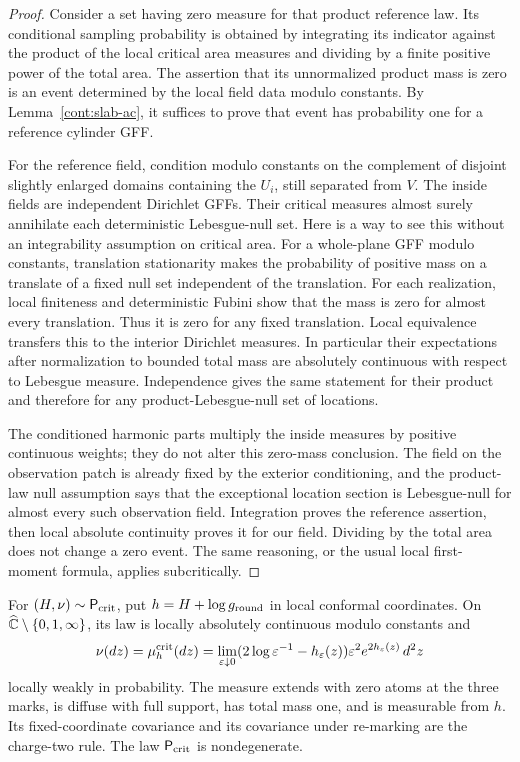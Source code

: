 \begin{proof}
Consider a set having zero measure for that product reference law.  Its
conditional sampling probability is obtained by integrating its indicator
against the product of the local critical area measures and dividing by a
finite positive power of the total area.  The assertion that its unnormalized
product mass is zero is an event determined by the local field data modulo
constants.  By Lemma~\ref{cont:slab-ac}, it suffices to prove that event has
probability one for a reference cylinder GFF.

For the reference field, condition modulo constants on the complement of
disjoint slightly enlarged domains containing the $U_i$, still separated
from $V$.  The inside fields are independent Dirichlet GFFs.  Their critical
measures almost surely annihilate each deterministic Lebesgue-null set.
Here is a way to see this without an integrability assumption on critical
area.  For a whole-plane GFF modulo constants, translation stationarity
makes the probability of positive mass on a translate of a fixed null set
independent of the translation.  For each realization, local finiteness and
deterministic Fubini show that the mass is zero for almost every translation.
Thus it is zero for any fixed translation.  Local equivalence transfers this
to the interior Dirichlet measures.  In particular their expectations after
normalization to bounded total mass are absolutely continuous with respect
to Lebesgue measure.  Independence gives the same statement for their
product and therefore for any product-Lebesgue-null set of locations.

The conditioned harmonic parts multiply the inside measures by positive
continuous weights; they do not alter this zero-mass conclusion.  The field
on the observation patch is already fixed by the exterior conditioning, and
the product-law null assumption says that the exceptional location section
is Lebesgue-null for almost every such observation field.  Integration proves
the reference assertion, then local absolute continuity proves it for our
field.  Dividing by the total area does not change a zero event.  The same
reasoning, or the usual local first-moment formula, applies subcritically.
\end{proof}

\begin{proposition}
\label{cont:area-identification}
For $(H,\nu)\sim \mathsf P_{\rm crit}$, put $h=H+\log g_{\rm round}$ in local
conformal coordinates.  On $\widehat{\mathbb C}\setminus\{0,1,\infty\}$, its law is
locally absolutely continuous modulo constants and
\[
 \nu(dz)=\mu_h^{\rm crit}(dz)
   =\lim_{\varepsilon\downarrow0}
      (2\log\varepsilon^{-1}-h_\varepsilon(z))\varepsilon^2e^{2h_\varepsilon(z)}\,d^2z
\]
locally weakly in probability.  The measure extends with zero atoms at the
three marks, is diffuse with full support, has total mass one, and is
measurable from $h$.  Its fixed-coordinate covariance and its covariance
under re-marking are the charge-two rule.  The law $\mathsf P_{\rm crit}$ is
nondegenerate.
\end{proposition}

